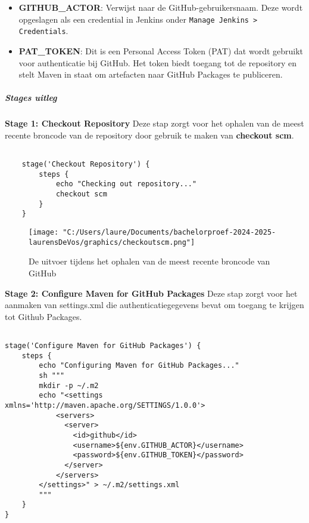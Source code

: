 \begin{itemize}
    \item \textbf{GITHUB\_ACTOR}: Verwijst naar de GitHub-gebruikersnaam. Deze wordt opgeslagen als een credential in Jenkins onder \texttt{Manage Jenkins > Credentials}.
    \item \textbf{PAT\_TOKEN}: Dit is een Personal Access Token (PAT) dat wordt gebruikt voor authenticatie bij GitHub. Het token biedt toegang tot de repository en stelt Maven in staat om artefacten naar GitHub Packages te publiceren.
\end{itemize}

\subparagraph{Stages uitleg}
\textbf{Stage 1: Checkout Repository}
Deze stap zorgt voor het ophalen van de meest recente broncode van de repository door gebruik te maken van \textbf{checkout scm}.

\begin{verbatim}
    
    stage('Checkout Repository') {
        steps {
            echo "Checking out repository..."
            checkout scm
        }
    }

\end{verbatim}

\begin{figure}[h!]
    \centering
    \texttt{[image: "C:/Users/laure/Documents/bachelorproef-2024-2025-laurensDeVos/graphics/checkoutscm.png"]}
    \caption{De uitvoer tijdens het ophalen van de meest recente broncode van GitHub}
\end{figure}


\textbf{Stage 2: Configure Maven for GitHub Packages}
Deze stap zorgt voor het aanmaken van settings.xml die authenticatiegegevens bevat om toegang te krijgen tot Github Packages.

\begin{verbatim}
    
stage('Configure Maven for GitHub Packages') {
    steps {
        echo "Configuring Maven for GitHub Packages..."
        sh """
        mkdir -p ~/.m2
        echo "<settings xmlns='http://maven.apache.org/SETTINGS/1.0.0'>
            <servers>
              <server>
                <id>github</id>
                <username>${env.GITHUB_ACTOR}</username>
                <password>${env.GITHUB_TOKEN}</password>
              </server>
            </servers>
        </settings>" > ~/.m2/settings.xml
        """
    }
}
    
\end{verbatim}

